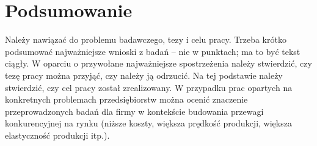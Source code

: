 \section*{Podsumowanie} 

Należy nawiązać do problemu badawczego, tezy i celu pracy. Trzeba krótko podsumować najważniejsze wnioski z badań -- nie w punktach; ma to być tekst ciągły. W oparciu o przywołane najważniejsze spostrzeżenia należy stwierdzić, czy tezę pracy można przyjąć, czy należy ją odrzucić. Na tej podstawie należy stwierdzić, czy cel pracy został zrealizowany. W przypadku prac opartych na konkretnych problemach przedsiębiorstw można ocenić znaczenie przeprowadzonych badań dla firmy w kontekście budowania przewagi konkurencyjnej na rynku (niższe koszty, większa prędkość produkcji, większa elastyczność produkcji itp.). 